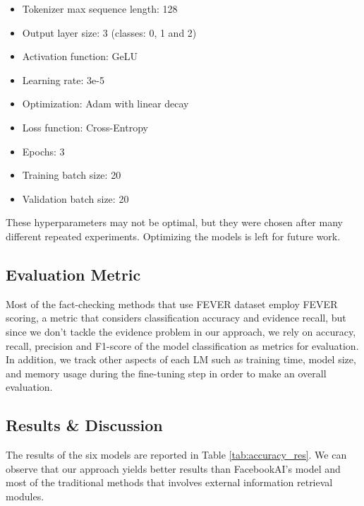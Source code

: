 \documentclass[10pt, english]{report}
\begin{document}
\begin{itemize}
\item Tokenizer max sequence length: 128
\item Output layer size: 3 (classes: 0, 1 and 2)
\item Activation function: GeLU
\item Learning rate: 3e-5
\item Optimization: Adam with linear decay
\item Loss function: Cross-Entropy
\item Epochs: 3
\item Training batch size: 20
\item Validation batch size: 20\\
\end{itemize}

These hyperparameters may not be optimal, but they were chosen after many different repeated experiments. Optimizing the models is left for future work.
\subsection{Evaluation Metric}
Most of the fact-checking methods that use FEVER dataset employ FEVER scoring\cite{thorne2018fever}, a metric that considers classification accuracy and evidence recall, but since we don't tackle the evidence problem in our approach, we rely on accuracy, recall, precision and F1-score of the model classification as metrics for evaluation.\\
In addition, we track other aspects of each LM such as training time, model size, and memory usage during the fine-tuning step in order to make an overall evaluation.
\subsection{Results \& Discussion}
The results of the six models are reported in Table \ref{tab:accuracy_res}. We can observe that our approach yields better results than FacebookAI's model and most of the traditional methods that involves external information retrieval modules.\\
\end{document}
